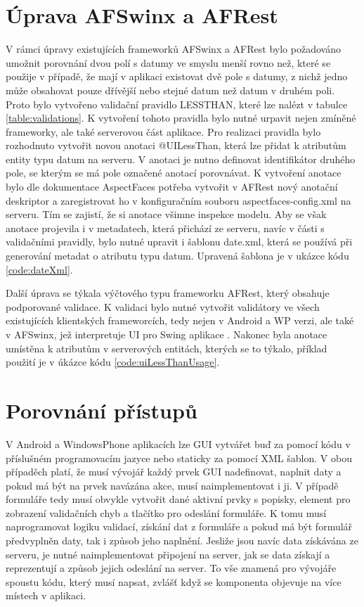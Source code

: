 \section{Úprava AFSwinx a AFRest}
V rámci úpravy existujících frameworků AFSwinx a AFRest \cite{tomasek-thesis} bylo požadováno umožnit porovnání dvou polí s datumy ve smyslu menší rovno než, které se použije v případě, že mají v aplikaci existovat dvě pole s datumy, z nichž jedno může obsahovat pouze dřívější nebo stejné datum než datum v druhém poli. Proto bylo vytvořeno validační pravidlo LESSTHAN, které lze nalézt v tabulce \ref{table:validations}. K vytvoření tohoto pravidla bylo nutné urpavit nejen zmíněné frameworky, ale také serverovou část aplikace. Pro realizaci pravidla bylo rozhodnuto vytvořit novou anotaci @UILessThan, která lze přidat k atributům entity typu datum na serveru. V anotaci je nutno definovat identifikátor druhého pole, se kterým se má pole označené anotací porovnávat. K vytvoření anotace bylo dle dokumentace AspectFaces \cite{aspect-faces} potřeba vytvořit v AFRest nový anotační deskriptor a zaregistrovat ho v konfiguračním souboru aspectfaces-config.xml na serveru. Tím se zajistí, že si anotace všimne inspekce modelu. Aby se však anotace projevila i v metadatech, která přichází ze serveru, navíc v části s validačními pravidly, bylo nutné upravit i šablonu date.xml, která se používá při generování metadat o atributu typu datum. Upravená šablona je v ukázce kódu \ref{code:dateXml}.

Další úprava se týkala výčtového typu frameworku AFRest, který obsahuje podporované validace. K validaci bylo nutné vytvořit validátory ve všech existujících klientských frameworcích, tedy nejen v Android a WP verzi, ale také v AFSwinx, jež interpretuje UI pro Swing aplikace \cite{tomasek-thesis}. Nakonec byla anotace umístěna k atributům v serverových entitách, kterých se to týkalo, příklad použití je v úkázce kódu \ref{code:uiLessThanUsage}.

\section{Porovnání přístupů}
V Android a WindowsPhone aplikacích lze GUI vytvářet buď za pomocí kódu v příslušném programovacím jazyce nebo staticky za pomocí XML šablon. V obou případěch platí, že musí vývojář každý prvek GUI nadefinovat, naplnit daty a pokud má být na prvek navázána akce, musí naimplementovat i ji. V případě formuláře tedy musí obvykle vytvořit dané aktivní prvky s popisky, element pro zobrazení validačních chyb a tlačítko pro odeslání formuláře. K tomu musí naprogramovat logiku validací, získání dat z formuláře a pokud má být formulář předvyplněn daty, tak i způsob jeho naplnění. Jesliže jsou navíc data získávána ze serveru, je nutné naimplementovat připojení na server, jak se data získají a reprezentují a způsob jejich odeslání na server. To vše znamená pro vývojáře spoustu kódu, který musí napsat, zvlášť když se komponenta objevuje na více místech v aplikaci. 

